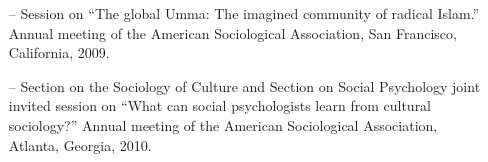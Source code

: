 \begin{itemize}[itemsep=-0.5ex]
    \item[--] Session on ``The global Umma: The imagined community of radical Islam.''  Annual meeting of the American Sociological Association, San Francisco, California, 2009.
    
    \item[--] Section on the Sociology of Culture and Section on Social Psychology joint invited session on ``What can social psychologists learn from cultural sociology?''   Annual meeting of the American Sociological Association, Atlanta, Georgia, 2010.
\end{itemize}